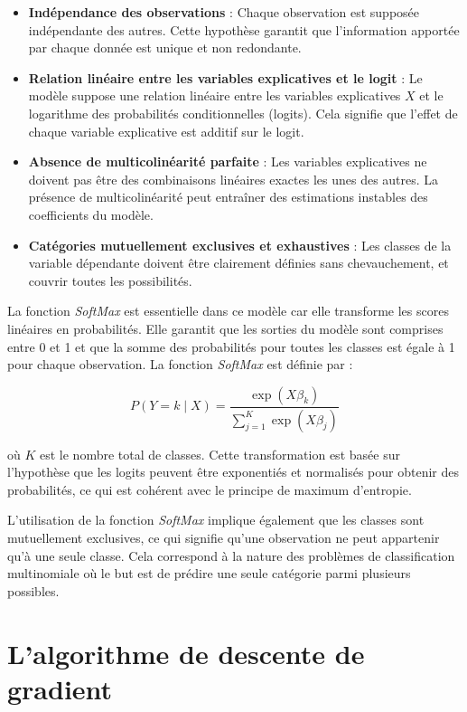 \documentclass[10pt,french]{report}
\begin{document}
	\begin{itemize}
		\item \textbf{Indépendance des observations} : Chaque observation est supposée indépendante des autres. Cette hypothèse garantit que l'information apportée par chaque donnée est unique et non redondante.

		\item \textbf{Relation linéaire entre les variables explicatives et le logit} : Le modèle suppose une relation linéaire entre les variables explicatives \( X \) et le logarithme des probabilités conditionnelles (logits). Cela signifie que l'effet de chaque variable explicative est additif sur le logit.

		\item \textbf{Absence de multicolinéarité parfaite} : Les variables explicatives ne doivent pas être des combinaisons linéaires exactes les unes des autres. La présence de multicolinéarité peut entraîner des estimations instables des coefficients du modèle.

		\item \textbf{Catégories mutuellement exclusives et exhaustives} : Les classes de la variable dépendante doivent être clairement définies sans chevauchement, et couvrir toutes les possibilités.

	\end{itemize}

	La fonction \textit{SoftMax} est essentielle dans ce modèle car elle transforme les scores linéaires en probabilités. Elle garantit que les sorties du modèle sont comprises entre 0 et 1 et que la somme des probabilités pour toutes les classes est égale à 1 pour chaque observation. La fonction \textit{SoftMax} est définie par :

	\[
	P(Y = k \mid X) = \frac{\exp(X\beta_k)}{\sum_{j=1}^K \exp(X\beta_j)}
	\]

	où \( K \) est le nombre total de classes. Cette transformation est basée sur l'hypothèse que les logits peuvent être exponentiés et normalisés pour obtenir des probabilités, ce qui est cohérent avec le principe de maximum d'entropie.

	L'utilisation de la fonction \textit{SoftMax} implique également que les classes sont mutuellement exclusives, ce qui signifie qu'une observation ne peut appartenir qu'à une seule classe. Cela correspond à la nature des problèmes de classification multinomiale où le but est de prédire une seule catégorie parmi plusieurs possibles.

	\section{L'algorithme de descente de gradient}
\end{document}
